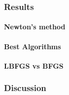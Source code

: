 \subsubsection{Results}
\paragraph{Newton's method}
\paragraph{Best Algorithms}
\paragraph{LBFGS vs BFGS}

\subsubsection{Discussion}
